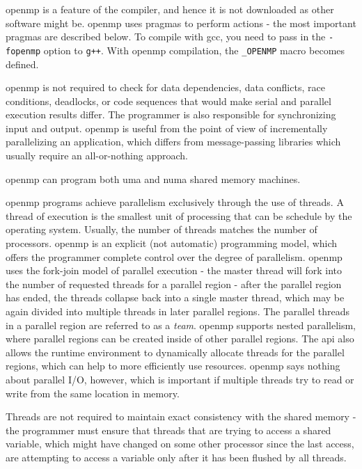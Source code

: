 \documentclass[10pt]{article}
\begin{document}
\begin{flushleft}
\gls{openmp} is a feature of the compiler, and hence it is not downloaded as other software might be. \gls{openmp} uses pragmas to perform actions - the most important pragmas are described below. To compile with gcc, you need to pass in the {\tt -fopenmp} option to {\tt g++}. With \gls{openmp} compilation, the {\tt \_OPENMP} macro becomes defined.

\gls{openmp} is not required to check for data dependencies, data conflicts, race conditions, deadlocks, or code sequences that would make serial and parallel execution results differ. The programmer is also responsible for synchronizing input and output. \gls{openmp} is useful from the point of view of incrementally parallelizing an application, which differs from message-passing libraries which usually require an all-or-nothing approach. 

\gls{openmp} can program both \gls{uma} and \gls{numa} shared memory machines. 

\gls{openmp} programs achieve parallelism exclusively through the use of threads. A thread of execution is the smallest unit of processing that can be schedule by the operating system. Usually, the number of threads matches the number of processors. \gls{openmp} is an explicit (not automatic) programming model, which offers the programmer complete control over the degree of parallelism. \gls{openmp} uses the fork-join model of parallel execution - the master thread will fork into the number of requested threads for a parallel region - after the parallel region has ended, the threads collapse back into a single master thread, which may be again divided into multiple threads in later parallel regions. The parallel threads in a parallel region are referred to as a \textit{team}. \gls{openmp} supports nested parallelism, where parallel regions can be created inside of other parallel regions. The \gls{api} also allows the runtime environment to dynamically allocate threads for the parallel regions, which can help to more efficiently use resources. \gls{openmp} says nothing about parallel I/O, however, which is important if multiple threads try to read or write from the same location in memory.

Threads are not required to maintain exact consistency with the shared memory - the programmer must ensure that threads that are trying to access a shared variable, which might have changed on some other processor since the last access, are attempting to access a variable only after it has been flushed by all threads.


\end{flushleft}
\end{document}
